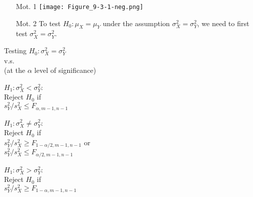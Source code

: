 \begin{frame}
\begin{enumerate}
	\item[Mot. 1]
	\texttt{[image: Figure\_9-3-1-neg.png]}
	\vfill
\item[Mot. 2] To test $H_0:\mu_X=\mu_Y$ under the assumption $\sigma_X^2=\sigma_Y^2$, we need to first test $\sigma_X^2 = \sigma_Y^2$.
	\end{enumerate}
\end{frame}
\begin{frame}
\centering
Testing $H_0:\sigma_X^2 = \sigma_Y^2$ \\[1em]
v.s.\\[1em]
(at the $\alpha$ level of significance)
\\
\vfill

\begin{minipage}{0.32\textwidth}
\centering
$H_1:\sigma_X^2 <\sigma_Y^2$:\\[1em]
Reject $H_0$ if \\[1em]
$s_Y^2/s_X^2\le F_{\alpha,m-1,n-1}$\\
\vspace{1.2em}
\phantom{aaa}
\end{minipage}
\begin{minipage}{0.32\textwidth}
\centering
$H_1:\sigma^2_X \ne \sigma^2_Y$:\\[1em]
Reject $H_0$ if \\[1em]
$s_Y^2/s_X^2 \ge F_{1-\alpha/2,m-1,n-1}$ or\\
$s_Y^2/s_X^2 \le F_{\alpha/2,m-1,n-1}$
\end{minipage}
\begin{minipage}{0.32\textwidth}
\centering
$H_1:\sigma^2_X>\sigma^2_Y$:\\[1em]
Reject $H_0$ if \\[1em]
$s_Y^2/s_X^2\ge F_{1-\alpha,m-1,n-1}$\\
\vspace{1.2em}
\phantom{aaa}
\end{minipage}
\end{frame}
